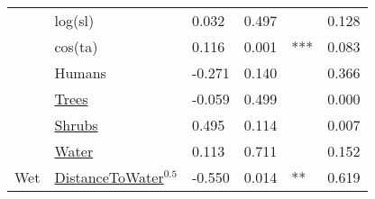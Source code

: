 \begin{tabular}[t]{llllll}
 & log(sl) & 0.032 & 0.497 &  & 0.128\\

 & cos(ta) & 0.116 & 0.001 & *** & 0.083\\

 & Humans & -0.271 & 0.140 &  & 0.366\\

 & \underline{Trees} & -0.059 & 0.499 &  & 0.000\\

 & \underline{Shrubs} & 0.495 & 0.114 &  & 0.007\\

 & \underline{Water} & 0.113 & 0.711 &  & 0.152\\

\multirow{-8}{*}{\raggedright\arraybackslash Wet} & \underline{DistanceToWater}$^{0.5}$ & -0.550 & 0.014 & ** & 0.619\\
\bottomrule
\end{tabular}
